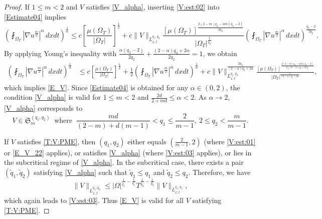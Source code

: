 \documentclass{amsart}
\numberwithin{equation}{section}
\begin{document}
\begin{proof}
If $1\leq m <2$ and $V$ satisfies \eqref{V_alpha}, inserting \eqref{V:est:02} into \eqref{Estimate04} implies 
 \begin{equation}\label{V:est:03}
\left(\fint_{\Omega_T} \left|\nabla u^{\frac{m}{2}}\right|^{\alpha} \,dxdt\right)^{\frac{1}{\alpha}}
\le c \left[ \frac{\mu(\Omega_{T})}{|\Omega_T|}\right]^{\frac{1}{2}}
+ c \|V\|_{L_{x,t}^{q_1, q_2}} \frac{\left[\mu(\Omega_{T})\right]^{\frac{2(2-m)q_2 - \alpha m (q_2 -2)}{4q_2}}}{|\Omega_{T}|^{\frac{1}{q_2}}} 
\left(\fint_{\Omega_T} \left|\nabla u^{\frac{m}{2}}\right|^{\alpha}\,dxdt\right)^{\frac{q_2 -2}{2q_2}}. 
	\end{equation}   
By applying Young's inequality with $\frac{\alpha(q_2 -2)}{2q_2} + \frac{(2-\alpha)q_2 + 2\alpha}{2q_2}=1$, we obtain 
\begin{equation*}\label{V:est:04}\begin{aligned}
\left(\fint_{\Omega_T} \left|\nabla u^{\frac{m}{2}}\right|^{\alpha} \,dxdt\right)^{\frac{1}{\alpha}}
&\le c \left[ \frac{\mu(\Omega_{T})}{|\Omega_T|}\right]^{\frac{1}{2}}
+ \frac{1}{2} \left(\fint_{\Omega_T} \left|\nabla u^{\frac{m}{2}}\right|^{\alpha} \,dxdt\right)^{\frac{1}{\alpha}} + c\|V\|_{L_{x,t}^{q_1, q_2}}^{\frac{2q_2}{(2-\alpha)q_2 + 2\alpha}} 
\frac{\left[\mu(\Omega_{T})\right]^{\frac{2(2-m)q_2-\alpha m(q_2-2)}{2\left[(2-\alpha)q_2 + 2\alpha\right]}}}{|\Omega_{T}|^{\frac{2}{(2-\alpha)q_2 + 2\alpha}}},
\end{aligned}\end{equation*}
which implies \eqref{E_V}. Since \eqref{Estimate04} is obtained for any $\alpha \in (0,2)$, the condition \eqref{V_alpha} is valid for $1\leq m <2$ and $\frac{2d}{2+md} \leq \alpha < 2$. As $\alpha \to 2$, \eqref{V_alpha} corresponds to 
\[
V \in \mathfrak{S}_{m}^{(q_1,q_2)} \ \text{ where } \ \frac{md}{(2-m)+d(m-1)} < q_1 \leq \frac{2}{m-1}, \  2 \leq q_2 < \frac{m}{m-1}.
\]

If $V$ satisfies \eqref{T:V:PME}, then $(q_1,q_2)$ either equals $\left( \frac{2}{m - 1}, 2 \right)$ (where \eqref{V:est:01} or \eqref{E_V_22} applies), or satisfies \eqref{V_alpha} (where \eqref{V:est:03} applies), or lies in the subcritical regime of \eqref{V_alpha}. In the subcritical case, there exists a pair $(\tilde{q}_1, \tilde{q}_2)$ satisfying \eqref{V_alpha} such that $\tilde{q}_1 \leq q_1$ and $\tilde{q}_2 \leq q_2$. Therefore, we have 
\begin{equation}\label{subSalpha}
\|V\|_{L^{\tilde{q}_1, \tilde{q}_2}_{x,t}} \leq |\Omega|^{\frac{1}{\tilde{q}_1} - \frac{1}{q_1}} T^{\frac{1}{\tilde{q}_2} - \frac{1}{q_2}} \|V\|_{L^{q_1, q_2}_{x,t}},
\end{equation}
which again leads to \eqref{V:est:03}. Thus \eqref{E_V} is valid for all $V$ satisfying \eqref{T:V:PME}.



\end{proof}
\end{document}
